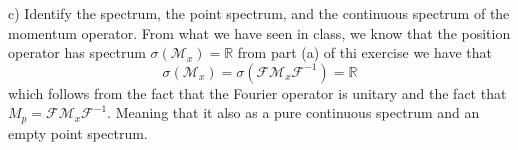 \documentclass{article}
\newcommand{\R}{\mathbb{R}}
\newcommand{\M}{\mathcal{M}}
\newcommand{\F}{\mathcal{F}}
\begin{document}
c) Identify the spectrum, the point spectrum, and the continuous spectrum of
the momentum operator. From what we have seen in class, we know that the position operator has spectrum $\sigma(\M_x) = \R$ from part (a) of thi exercise we have that
\[
    \sigma(\M_x) = \sigma(\F \M_x \F^{-1}) = \R
\]
which follows from the fact that the Fourier operator is unitary and the fact that $M_p = \F \M_x \F^{-1}$. Meaning that it also as a pure continuous spectrum and an empty point spectrum. 
\end{document}

